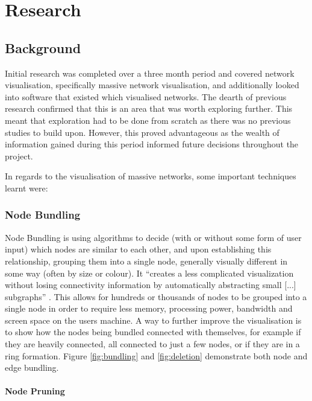 \documentclass[../dissertation.tex]{subfiles}
\begin{document}
\chapter{Research}
\label{sec:research}

\section{Background}
\label{sec:background}

Initial research was completed over a three month period and covered network visualisation, specifically massive network visualisation, and additionally looked into software that existed which visualised networks. The dearth of previous research confirmed that this is an area that was worth exploring further. This meant that exploration had to be done from scratch as there was no previous studies to build upon. However, this proved advantageous as the wealth of information gained during this period informed future decisions throughout the project.

In regards to the visualisation of massive networks, some important techniques learnt were:

\subsection{Node Bundling}
\label{sec:node_bundling}

Node Bundling is using algorithms to decide (with or without some form of user input) which nodes are similar to each other, and upon establishing this relationship, grouping them into a single node, generally visually different in some way (often by size or colour). It ``creates a less complicated visualization without losing connectivity information by automatically abstracting small [...] subgraphs'' \cite{six2003effective}. This allows for hundreds or thousands of nodes to be grouped into a single node in order to require less memory, processing power, bandwidth and screen space on the users machine. A way to further improve the visualisation is to show how the nodes being bundled connected with themselves, for example if they are heavily connected, all connected to just a few nodes, or if they are in a ring formation. Figure \ref{fig:bundling} and \ref{fig:deletion} demonstrate both node and edge bundling.

\subsubsection{Node Pruning}
\label{sec:node-pruning}
\end{document}

